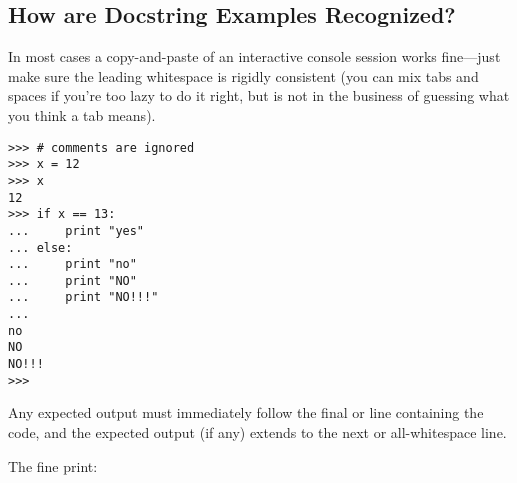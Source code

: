 \subsection{How are Docstring Examples Recognized?}

In most cases a copy-and-paste of an interactive console session works
fine---just make sure the leading whitespace is rigidly consistent
(you can mix tabs and spaces if you're too lazy to do it right, but
 is not in the business of guessing what you think a tab
means).

\begin{verbatim}
>>> # comments are ignored
>>> x = 12
>>> x
12
>>> if x == 13:
...     print "yes"
... else:
...     print "no"
...     print "NO"
...     print "NO!!!"
...
no
NO
NO!!!
>>>
\end{verbatim}

Any expected output must immediately follow the final
 or  line containing the code, and
the expected output (if any) extends to the next 
or all-whitespace line.

The fine print:

